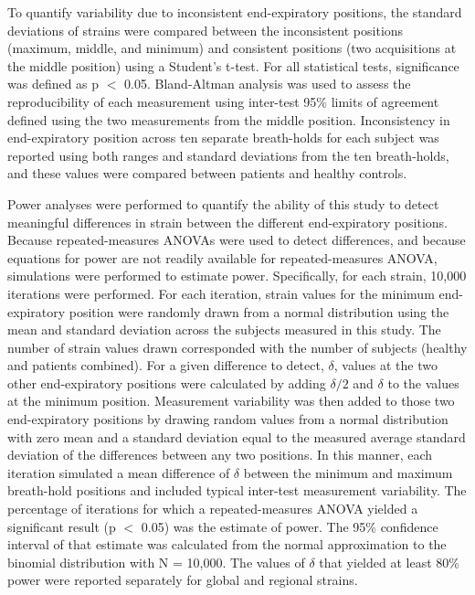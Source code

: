 	To quantify variability due to inconsistent end-expiratory positions, the standard deviations of strains were compared between the inconsistent positions (maximum, middle, and minimum) and consistent positions (two acquisitions at the middle position) using a Student’s t-test. For all statistical tests, significance was defined as p $<$ 0.05. Bland-Altman analysis \cite{Bland1986} was used to assess the reproducibility of each measurement using inter-test 95\% limits of agreement defined using the two measurements from the middle position. Inconsistency in end-expiratory position across ten separate breath-holds for each subject was reported using both ranges and standard deviations from the ten breath-holds, and these values were compared between patients and healthy controls.
	
	Power analyses were performed to quantify the ability of this study to detect meaningful differences in strain between the different end-expiratory positions. Because repeated-measures ANOVAs were used to detect differences, and because equations for power are not readily available for repeated-measures ANOVA, simulations were performed to estimate power. Specifically, for each strain, 10,000 iterations were performed. For each iteration, strain values for the minimum end-expiratory position were randomly drawn from a normal distribution using the mean and standard deviation across the subjects measured in this study.  The number of strain values drawn corresponded with the number of subjects (healthy and patients combined). For a given difference to detect, $\delta$, values at the two other end-expiratory positions were calculated by adding $\delta/2$ and $\delta$ to the values at the minimum position. Measurement variability was then added to those two end-expiratory positions by drawing random values from a normal distribution with zero mean and a standard deviation equal to the measured average standard deviation of the differences between any two positions. In this manner, each iteration simulated a mean difference of $\delta$ between the minimum and maximum breath-hold positions and included typical inter-test measurement variability. The percentage of iterations for which a repeated-measures ANOVA yielded a significant result (p $<$  0.05) was the estimate of power. The 95\% confidence interval of that estimate was calculated from the normal approximation to the binomial distribution with N = 10,000. The values of $\delta$ that yielded at least 80\% power were reported separately for global and regional strains.

